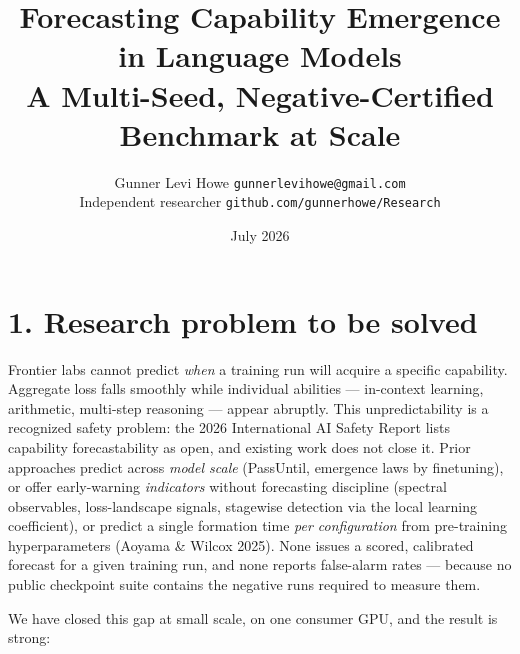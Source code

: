 \documentclass[11pt]{article}
\title{\vspace{-1.2cm}\textbf{Forecasting Capability Emergence in Language Models}\\
\large A Multi-Seed, Negative-Certified Benchmark at Scale}
\author{Gunner Levi Howe \quad\textbar\quad \texttt{gunnerlevihowe@gmail.com}\\
\small Independent researcher \quad\textbar\quad
\texttt{github.com/gunnerhowe/Research}}
\date{July 2026}
\begin{document}
\maketitle
\vspace{-0.6cm}

\section*{1. Research problem to be solved}

Frontier labs cannot predict \emph{when} a training run will acquire a specific
capability. Aggregate loss falls smoothly while individual abilities --- in-context
learning, arithmetic, multi-step reasoning --- appear abruptly. This unpredictability is
a recognized safety problem: the 2026 International AI Safety Report lists capability
forecastability as open, and existing work does not close it. Prior approaches predict
across \emph{model scale} (PassUntil, emergence laws by finetuning), or offer
early-warning \emph{indicators} without forecasting discipline (spectral observables,
loss-landscape signals, stagewise detection via the local learning coefficient), or
predict a single formation time \emph{per configuration} from pre-training hyperparameters
(Aoyama \& Wilcox 2025). None issues a scored, calibrated forecast for a given training
run, and none reports false-alarm rates --- because no public checkpoint suite contains
the negative runs required to measure them.

We have closed this gap at small scale, on one consumer GPU, and the result is strong:
\end{document}
